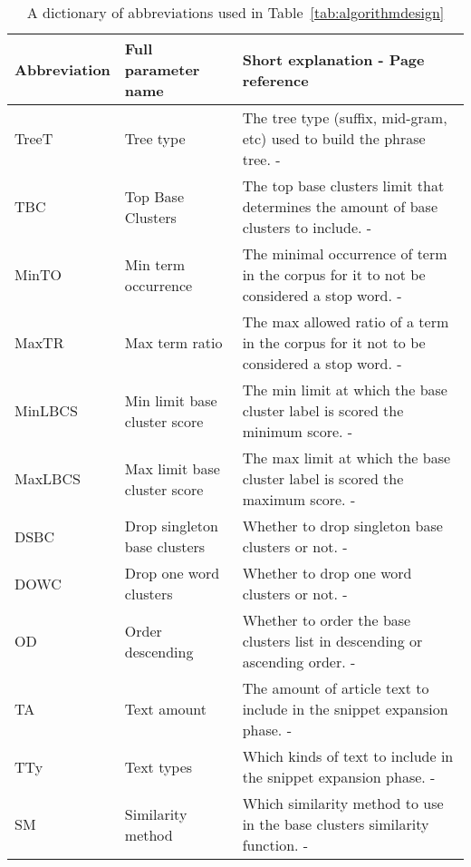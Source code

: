 \begin{landscape}
\begin{table}
\begin{center}
	\begin{tabular}{|l|l|l|}
	\hline
	Abbreviation & Full parameter name & Short explanation - Page reference\\
	\hline
	TreeT & Tree type & The tree type (suffix, mid-gram, etc) used to build the phrase tree. - \pageref{subsubsec:snippetexpansion}\\
	TBC & Top Base Clusters & The top base clusters limit that determines the amount of base clusters to include. - \pageref{subsubsec:baseclusters}\\
	MinTO & Min term occurrence & The minimal occurrence of term in the corpus for it to not be considered a stop word. - \pageref{subsubsec:baseclusters}\\
	MaxTR & Max term ratio & The max allowed ratio of a term in the corpus for it not to be considered a stop word. - \pageref{subsubsec:baseclusters}\\
	MinLBCS & Min limit base cluster score & The min limit at which the base cluster label is scored the minimum score. - \pageref{subsubsec:baseclusters}\\
	MaxLBCS & Max limit base cluster score & The max limit at which the base cluster label is scored the maximum score. - \pageref{subsubsec:baseclusters}\\
	DSBC & Drop singleton base clusters & Whether to drop singleton base clusters or not. - \pageref{subsubsec:baseclusters}\\
	DOWC & Drop one word clusters & Whether to drop one word clusters or not. - \pageref{subsubsec:componentmerge}\\
	OD & Order descending & Whether to order the base clusters list in descending or ascending order. - \pageref{subsubsec:baseclusters}\\
	TA & Text amount & The amount of article text to include in the snippet expansion phase. - \pageref{subsubsec:snippetfiltering}\\
	TTy & Text types & Which kinds of text to include in the snippet expansion phase. - \pageref{subsubsec:snippetfiltering}\\
	SM & Similarity method & Which similarity method to use in the base clusters similarity function. - \pageref{subsubsec:baseclustermerging}\\
	\hline
	\end{tabular}
	\caption{A dictionary of abbreviations used in Table~\ref{tab:algorithmdesign}}
	\label{tab:parameterabbreviationdictionary}
\end{center}
\end{table}
\end{landscape}

